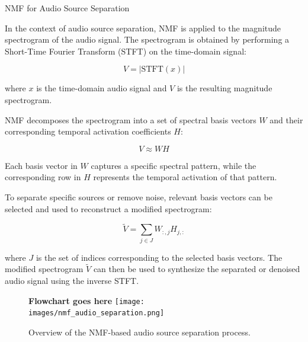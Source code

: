 \documentclass{if-beamer}
\begin{document}
\begin{frame}{NMF for Audio Source Separation}

In the context of audio source separation, NMF is applied to the magnitude spectrogram of the audio signal. The spectrogram is obtained by performing a Short-Time Fourier Transform (STFT) on the time-domain signal:

\begin{equation*}
V = |\text{STFT}(x)|
\end{equation*}

where $x$ is the time-domain audio signal and $V$ is the resulting magnitude spectrogram.

NMF decomposes the spectrogram into a set of spectral basis vectors $W$ and their corresponding temporal activation coefficients $H$:

\begin{equation*}
V \approx WH
\end{equation*}

Each basis vector in $W$ captures a specific spectral pattern, while the corresponding row in $H$ represents the temporal activation of that pattern.

To separate specific sources or remove noise, relevant basis vectors can be selected and used to reconstruct a modified spectrogram:

\begin{equation*}
\tilde{V} = \sum_{j \in J} W_{:,j} H_{j,:}
\end{equation*}

where $J$ is the set of indices corresponding to the selected basis vectors. The modified spectrogram $\tilde{V}$ can then be used to synthesize the separated or denoised audio signal using the inverse STFT.

\begin{figure}[h]
    \centering
    \textbf{Flowchart goes here}
    \texttt{[image: images/nmf\_audio\_separation.png]}
    \caption{Overview of the NMF-based audio source separation process.}
\end{figure}

\end{frame}
\end{document}
